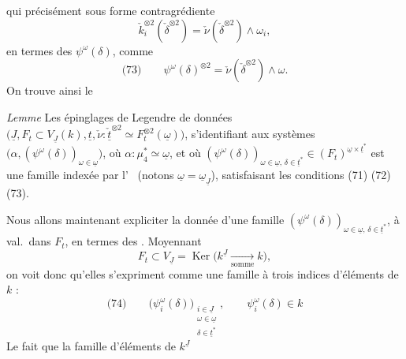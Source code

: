 \documentclass[11pt,a4paper]{article}
\begin{document}
qui précisément sous forme contragrédiente
\[
  \check{k}_i^{\otimes 2}(\check{\delta}^{\otimes 2}) = \check{\nu}(\check{\delta}^{\otimes 2}) \wedge \omega_i ,
\]
en termes des $\psi^{\omega}(\delta)$, comme
\[
  \text{(73)} \qquad \psi^{\omega}(\delta)^{\otimes 2} = \check{\nu}(\check{\delta}^{\otimes 2}) \wedge \omega .
\]
On trouve ainsi le

\emph{Lemme} Les épinglages de Legendre de données
$\bigl(\underline{J}, F_t \subset V_{\underline{J}}(k), \underline{t},
\check{\nu} : \check{\underline{t}}^{\otimes 2} \simeq F_t^{\otimes 2}(\underline{\omega})\bigr)$,
s'identifiant aux systèmes
$\bigl(\alpha, (\psi^{\omega}(\delta))_{\omega \in \underline{\omega}}\bigr)$, où
$\alpha : \mu_4^{*} \simeq \underline{\omega}$, et où
$(\psi^{\omega}(\delta))_{\omega \in \underline{\omega},\, \delta \in \underline{t}^{*}}
\in (F_t)^{\underline{\omega} \times \underline{t}^{*}}$
 
est une famille indexée par l'\ \ill{} (notons
$\underline{\omega} = \underline{\omega}_{\underline{J}}$), satisfaisant les
conditions (71) (72) (73).

\struck{\ill{}} Nous allons maintenant expliciter la donnée d'une famille
$(\psi^{\omega}(\delta))_{\omega \in \underline{\omega},\, \delta \in \underline{t}^{*}}$,
à val.\ dans $F_t$, en termes des \ill{}. Moyennant
\[
  F_t \subset V_{\underline{J}} = \operatorname{Ker}\bigl(k^{\underline{J}} \xrightarrow[\text{somme}]{} k\bigr) ,
\]
on voit donc qu'elles s'expriment comme une famille à trois indices
d'éléments de $k$ :
\[
  \text{(74)} \qquad \bigl(\psi_i^{\omega}(\delta)\bigr)_{\substack{i \in \underline{J} \\ \omega \in \underline{\omega} \\ \delta \in \underline{t}^{*}}},
  \qquad \psi_i^{\omega}(\delta) \in k
\]
Le fait que la famille d'éléments de $k^{\underline{J}}$
\end{document}
